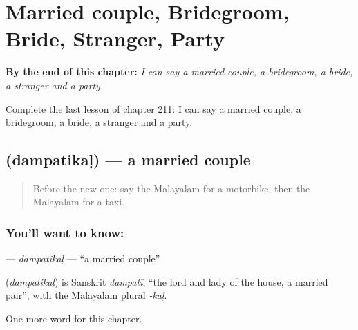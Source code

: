 
\chapter{Married couple, Bridegroom, Bride, Stranger, Party}
\label{ch:ml-married-couple-bridegroom-bride-stranger-party}

\begin{chapteropening}
\textbf{By the end of this chapter:} \emph{I can say a married couple, a bridegroom, a bride, a stranger and a party.}

Complete the last lesson of chapter 211: I can say a married couple, a bridegroom, a bride, a stranger and a party.
\end{chapteropening}

\section[\texorpdfstring{\ml{ദമ്പതികൾ} (dampatikaḷ)}{ദമ്പതികൾ (dampatikaḷ)}]{ (dampatikaḷ) — a married couple}

\label{lesson:ML-C211-dampatikal}



\begin{quote}
Before the new one: say the Malayalam for a motorbike, then the Malayalam for a taxi.
\end{quote}

\subsection*{You'll want to know: }
\textbf{} — \emph{dampatikaḷ} — \textquotedblleft{}a married couple\textquotedblright{}.

\begin{cousinweb}
\textbf{} (\emph{dampatikaḷ}) is Sanskrit \emph{dampatī}, \textquotedblleft{}the lord and lady of the house, a married pair\textquotedblright{}, with the Malayalam plural \emph{-kaḷ}.
\end{cousinweb}

\begin{grammarlens}[title={What you've built}]
One more word for this chapter.
\end{grammarlens}

